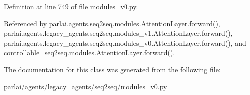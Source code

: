 Definition at line 749 of file modules\+\_\+v0.\+py.



Referenced by parlai.\+agents.\+seq2seq.\+modules.\+Attention\+Layer.\+forward(), parlai.\+agents.\+legacy\+\_\+agents.\+seq2seq.\+modules\+\_\+v1.\+Attention\+Layer.\+forward(), parlai.\+agents.\+legacy\+\_\+agents.\+seq2seq.\+modules\+\_\+v0.\+Attention\+Layer.\+forward(), and controllable\+\_\+seq2seq.\+modules.\+Attention\+Layer.\+forward().



The documentation for this class was generated from the following file\+:\begin{DoxyCompactItemize}
\item 
parlai/agents/legacy\+\_\+agents/seq2seq/\hyperlink{seq2seq_2modules__v0_8py}{modules\+\_\+v0.\+py}\end{DoxyCompactItemize}
